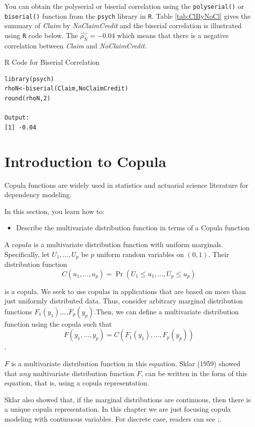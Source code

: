 \documentclass[]{book}
\providecommand{\tightlist}{%
  \setlength{\itemsep}{0pt}\setlength{\parskip}{0pt}}
\theoremstyle{definition}
\theoremstyle{definition}
\theoremstyle{definition}
\theoremstyle{remark}
\begin{document}
You can obtain the polyserial or biserial correlation using the
\texttt{polyserial()} or \texttt{biserial()} function from the
\texttt{psych} library in \texttt{R}. Table \ref{tab:ClByNoCl} gives the
summary of \emph{Claim} by \emph{NoClaimCredit} and the biserial
correlation is illustrated using \texttt{R} code below. The
\(\hat{\rho_N}=-0.04\) which means that there is a negative correlation
between \emph{Claim} and \emph{NoClaimCredit}.

R Code for Biserial Correlation

\hypertarget{display.bis.2}{}
\begin{verbatim}
library(psych)
rhoN<-biserial(Claim,NoClaimCredit)
round(rhoN,2)

Output:
[1] -0.04
\end{verbatim}

\section{Introduction to Copula}\label{S:Copula}

Copula functions are widely used in statistics and actuarial science
literature for dependency modeling.

In this section, you learn how to:

\begin{itemize}
\tightlist
\item
  Describe the multivariate distribution function in terms of a Copula
  function
\end{itemize}

A \(copula\) is a multivariate distribution function with uniform
marginals. Specifically, let \(U_1, \ldots, U_p\) be \(p\) uniform
random variables on \((0,1)\). Their distribution function
\[{C}(u_1, \ldots, u_p) = \Pr(U_1 \leq u_1, \ldots, U_p \leq
u_p)\]

is a copula. We seek to use copulas in applications that are based on
more than just uniformly distributed data. Thus, consider arbitrary
marginal distribution functions
\({F}_1(y_1)\),\ldots{},\({F}_p(y_p)\).Then, we can define a
multivariate distribution function using the copula such that
\[{F}(y_1, \ldots, y_p)= {C}({F}_1(y_1), \ldots,
{F}_p(y_p))\].

\(F\) is a multivariate distribution function in this equation. Sklar
(1959) showed that \(any\) multivariate distribution function \(F\), can
be written in the form of this equation, that is, using a copula
representation.

Sklar also showed that, if the marginal distributions are continuous,
then there is a unique copula representation. In this chapter we are
just focusing copula modeling with continuous variables. For discrete
case, readers can see
\citep{joe2014dependence};\citep{genest2007methods}.
\end{document}
